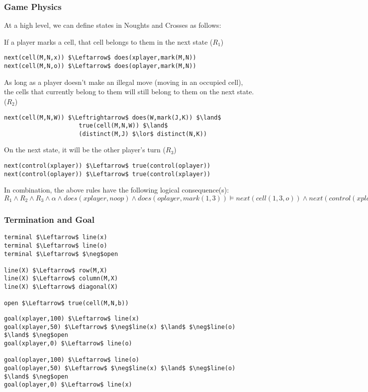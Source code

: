 \subsubsection{Game Physics}
At a high level, we can define states in Noughts and Crosses as follows:

If a player marks a cell, that cell belongs to them in the next state ($R_1$)
\begin{lstlisting}[morekeywords={next,does}]
next(cell(M,N,x)) $\Leftarrow$ does(xplayer,mark(M,N))
next(cell(M,N,o)) $\Leftarrow$ does(oplayer,mark(M,N))
\end{lstlisting}

As long as a player doesn't make an illegal move (moving in an occupied cell),
the cells that currently belong to them will still belong to them on the next
state. ($R_2$)
\begin{lstlisting}[morekeywords={next,does,true,distinct}]
next(cell(M,N,W)) $\Leftrightarrow$ does(W,mark(J,K)) $\land$
                     true(cell(M,N,W)) $\land$
                     (distinct(M,J) $\lor$ distinct(N,K))
\end{lstlisting}

On the next state, it will be the other player's turn ($R_3$)
\begin{lstlisting}[morekeywords={next, true}]
next(control(xplayer)) $\Leftarrow$ true(control(oplayer))
next(control(oplayer)) $\Leftarrow$ true(control(xplayer))
\end{lstlisting}

In combination, the above rules have the following logical consequence(s):\\
$R_1 \land R_2 \land R_3 \land \alpha \land does(xplayer, noop) \land
does(oplayer,mark(1,3)) \models next(cell(1,3,o)) \land next(control(xplayer))
\land ...$

\subsubsection{Termination and Goal}
\begin{lstlisting}[morekeywords={terminal,true}]
terminal $\Leftarrow$ line(x)
terminal $\Leftarrow$ line(o)
terminal $\Leftarrow$ $\neg$open

line(X) $\Leftarrow$ row(M,X)
line(X) $\Leftarrow$ column(M,X)
line(X) $\Leftarrow$ diagonal(X)

open $\Leftarrow$ true(cell(M,N,b))
\end{lstlisting}

\begin{lstlisting}[morekeywords={goal}]
goal(xplayer,100) $\Leftarrow$ line(x)
goal(xplayer,50) $\Leftarrow$ $\neg$line(x) $\land$ $\neg$line(o) $\land$ $\neg$open
goal(xplayer,0) $\Leftarrow$ line(o)

goal(oplayer,100) $\Leftarrow$ line(o)
goal(oplayer,50) $\Leftarrow$ $\neg$line(x) $\land$ $\neg$line(o) $\land$ $\neg$open
goal(oplayer,0) $\Leftarrow$ line(x)
\end{lstlisting}

